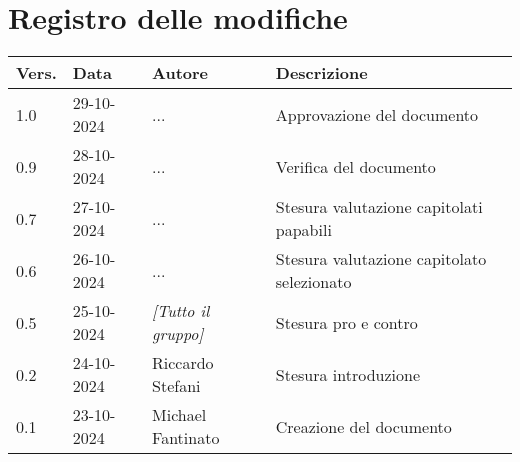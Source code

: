\section*{Registro delle modifiche}

\begin{table}[h]
    \centering
    \begin{tabular}{|l|l|l|l|}
        \hline
        \rowcolor[gray]{0.9}
        \textbf{Vers.} & \textbf{Data} & \textbf{Autore} & \textbf{Descrizione}\\
        \hline
        1.0 & 29-10-2024 & ... & Approvazione del documento\\
        \hline
        0.9 & 28-10-2024 & ... & Verifica del documento\\
        \hline
        0.7 & 27-10-2024 & ... & Stesura valutazione capitolati papabili\\
        \hline
        0.6 & 26-10-2024 & ... & Stesura valutazione capitolato selezionato\\
        \hline
        0.5 & 25-10-2024 & \emph{[Tutto il gruppo]} & Stesura pro e contro\\
        \hline
        0.2 & 24-10-2024 & Riccardo Stefani & Stesura introduzione\\
        \hline
        0.1 & 23-10-2024 & Michael Fantinato & Creazione del documento\\
        \hline
    \end{tabular}
\end{table}
